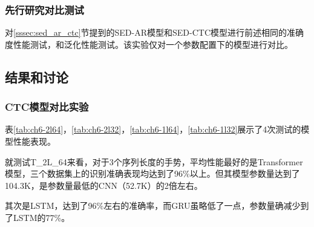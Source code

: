 \subsubsection{先行研究对比测试}

对\ref{sssec:sed_ar_ctc}节提到的SED-AR模型和SED-CTC模型进行前述相同的准确度性能测试，和泛化性能测试。该实验仅对一个参数配置下的模型进行对比。

\subsection{结果和讨论}

\subsubsection{CTC模型对比实验}

表\ref{tab:ch6-2l64}，\ref{tab:ch6-2l32}，\ref{tab:ch6-1l64}，\ref{tab:ch6-1l32}展示了4次测试的模型性能表现。

就测试T\_2L\_64来看，对于3个序列长度的手势，平均性能最好的是Transformer模型，三个数据集上的识别准确表现均达到了96\%以上。但其模型参数量达到了104.3K，是参数量最低的CNN（52.7K）的2倍左右。

其次是LSTM，达到了96\%左右的准确率，而GRU虽略低了一点，参数量确减少到了LSTM的77\%。 

